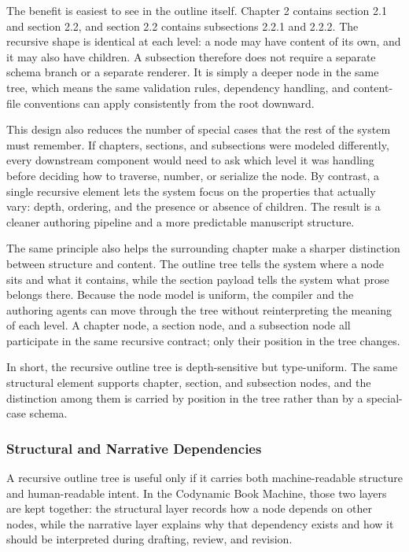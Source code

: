 \documentclass[11pt]{article}
\begin{document}
The benefit is easiest to see in the outline itself. Chapter 2 contains section 2.1 and section 2.2, and section 2.2 contains subsections 2.2.1 and 2.2.2. The recursive shape is identical at each level: a node may have content of its own, and it may also have children. A subsection therefore does not require a separate schema branch or a separate renderer. It is simply a deeper node in the same tree, which means the same validation rules, dependency handling, and content-file conventions can apply consistently from the root downward.

This design also reduces the number of special cases that the rest of the system must remember. If chapters, sections, and subsections were modeled differently, every downstream component would need to ask which level it was handling before deciding how to traverse, number, or serialize the node. By contrast, a single recursive element lets the system focus on the properties that actually vary: depth, ordering, and the presence or absence of children. The result is a cleaner authoring pipeline and a more predictable manuscript structure.

The same principle also helps the surrounding chapter make a sharper distinction between structure and content. The outline tree tells the system where a node sits and what it contains, while the section payload tells the system what prose belongs there. Because the node model is uniform, the compiler and the authoring agents can move through the tree without reinterpreting the meaning of each level. A chapter node, a section node, and a subsection node all participate in the same recursive contract; only their position in the tree changes.

In short, the recursive outline tree is depth-sensitive but type-uniform. The same structural element supports chapter, section, and subsection nodes, and the distinction among them is carried by position in the tree rather than by a special-case schema.



\subsubsection{Structural and Narrative Dependencies}


A recursive outline tree is useful only if it carries both machine-readable structure and human-readable intent. In the Codynamic Book Machine, those two layers are kept together: the structural layer records how a node depends on other nodes, while the narrative layer explains why that dependency exists and how it should be interpreted during drafting, review, and revision.
\end{document}
